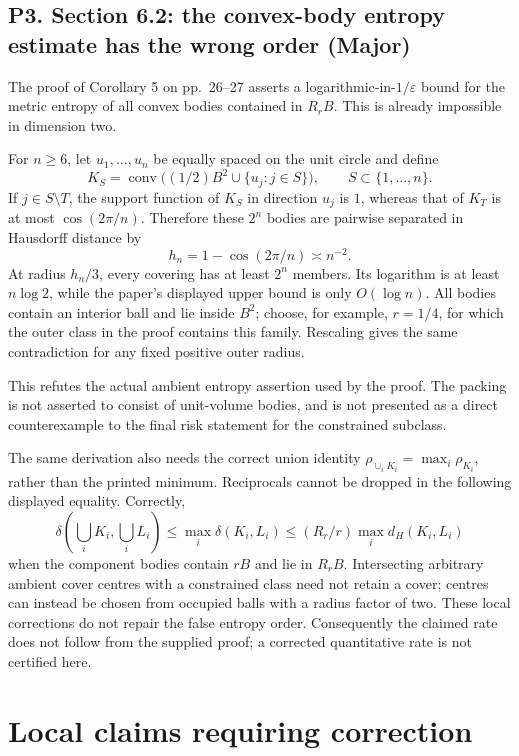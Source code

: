\documentclass[10pt]{article}
\begin{document}
\subsection*{P3. Section 6.2: the convex-body entropy estimate has the wrong order (Major)}
The proof of Corollary 5 on pp. 26–27 asserts a logarithmic-in-\(1/\varepsilon\) bound for the metric entropy of all convex bodies contained in \(R_rB\). This is already impossible in dimension two.\par
For \(n\ge6\), let \(u_1,\ldots,u_n\) be equally spaced on the unit circle and define \[K_S=\operatorname{conv}\bigl((1/2)B^2\cup\{u_j:j\in S\}\bigr),
 \qquad S\subset\{1,\ldots,n\}.\] If \(j\in S\setminus T\), the support function of \(K_S\) in direction \(u_j\) is \(1\), whereas that of \(K_T\) is at most \(\cos(2\pi/n)\). Therefore these \(2^n\) bodies are pairwise separated in Hausdorff distance by \[h_n=1-\cos(2\pi/n)\asymp n^{-2}.\] At radius \(h_n/3\), every covering has at least \(2^n\) members. Its logarithm is at least \(n\log2\), while the paper’s displayed upper bound is only \(O(\log n)\). All bodies contain an interior ball and lie inside \(B^2\); choose, for example, \(r=1/4\), for which the outer class in the proof contains this family. Rescaling gives the same contradiction for any fixed positive outer radius.\par
This refutes the actual ambient entropy assertion used by the proof. The packing is not asserted to consist of unit-volume bodies, and is not presented as a direct counterexample to the final risk statement for the constrained subclass.\par
The same derivation also needs the correct union identity \(\rho_{\cup_iK_i}=\max_i\rho_{K_i}\), rather than the printed minimum. Reciprocals cannot be dropped in the following displayed equality. Correctly, \[\delta\!\left(\bigcup_iK_i,\bigcup_iL_i\right)
 \le\max_i\delta(K_i,L_i)
 \le (R_r/r)\max_i d_H(K_i,L_i)\] when the component bodies contain \(rB\) and lie in \(R_rB\). Intersecting arbitrary ambient cover centres with a constrained class need not retain a cover; centres can instead be chosen from occupied balls with a radius factor of two. These local corrections do not repair the false entropy order. Consequently the claimed rate does not follow from the supplied proof; a corrected quantitative rate is not certified here.\par
\section*{Local claims requiring correction}
\end{document}
